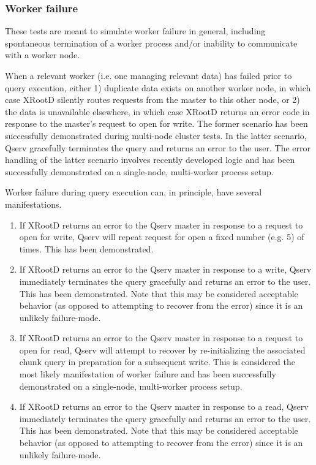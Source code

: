 \documentclass[DM,lsstdraft,toc]{lsstdoc}
\begin{document}
\subsubsection{Worker failure}\label{worker-failure}

These tests are meant to simulate worker failure in general, including
spontaneous termination of a worker process and/or inability to
communicate with a worker node.

When a relevant worker (i.e. one managing relevant data) has failed
prior to query execution, either 1) duplicate data exists on another
worker node, in which case XRootD silently
routes requests from the master to this other node, or 2) the data is
unavailable elsewhere, in which case XRootD
returns an error code in response to the master's request to open for
write. The former scenario has been successfully demonstrated during
multi-node cluster tests. In the latter scenario, Qserv gracefully
terminates the query and returns an error to the user. The error
handling of the latter scenario involves recently developed logic and
has been successfully demonstrated on a single-node, multi-worker
process setup.

Worker failure during query execution can, in principle, have several
manifestations.

\begin{enumerate}
\def\labelenumi{\arabic{enumi}.}
\item
  If XRootD returns an error to the Qserv
  master in response to a request to open for write, Qserv will repeat
  request for open a fixed number (e.g. 5) of times. This has been
  demonstrated.
\item
  If XRootD returns an error to the Qserv
  master in response to a write, Qserv immediately terminates the query
  gracefully and returns an error to the user. This has been
  demonstrated. Note that this may be considered acceptable behavior (as
  opposed to attempting to recover from the error) since it is an
  unlikely failure-mode.
\item
  If XRootD returns an error to the Qserv
  master in response to a request to open for read, Qserv will attempt
  to recover by re-initializing the associated chunk query in
  preparation for a subsequent write. This is considered the most likely
  manifestation of worker failure and has been successfully demonstrated
  on a single-node, multi-worker process setup.
\item
  If XRootD returns an error to the Qserv
  master in response to a read, Qserv immediately terminates the query
  gracefully and returns an error to the user. This has been
  demonstrated. Note that this may be considered acceptable behavior (as
  opposed to attempting to recover from the error) since it is an
  unlikely failure-mode.
\end{enumerate}
\end{document}
